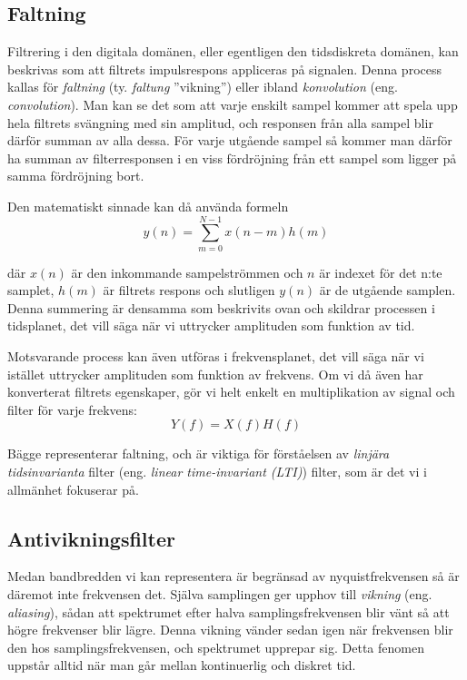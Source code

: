 \subsection{Faltning}

Filtrering i den digitala domänen, eller egentligen den tidsdiskreta domänen,
kan beskrivas som att filtrets impulsrespons appliceras på signalen. Denna
process kallas för \emph{faltning} (ty. \emph{faltung} ''vikning'') eller ibland
\emph{konvolution} (eng. \emph{convolution}).
Man kan se det som att varje enskilt sampel kommer att spela upp hela filtrets
svängning med sin amplitud, och responsen från alla sampel blir därför summan
av alla dessa.
För varje utgående sampel så kommer man därför ha summan av filterresponsen
i en viss fördröjning från ett sampel som ligger på samma fördröjning bort.

Den matematiskt sinnade kan då använda formeln
\[   y(n) = \sum_{m=0}^{N-1} x(n-m)h(m)   \]

där \(x(n)\) är den inkommande sampelströmmen och \(n\) är indexet för det
n:te samplet, \(h(m)\) är filtrets respons och slutligen \(y(n)\) är de utgående
samplen.
Denna summering är densamma som beskrivits ovan och skildrar processen
i tidsplanet, det vill säga när vi uttrycker amplituden som funktion av tid.

Motsvarande process kan även utföras i frekvensplanet, det vill säga när vi 
istället uttrycker amplituden som funktion av frekvens.
Om vi då även har konverterat filtrets egenskaper, gör vi helt enkelt en
multiplikation av signal och filter för varje frekvens:
\[   	Y(f) = X(f)H(f)   \]

Bägge representerar faltning, och är viktiga för förståelsen av \emph{linjära
tidsinvarianta} filter (eng. \emph{linear time-invariant (LTI)}) filter,
som är det vi i allmänhet fokuserar på.

\subsection{Antivikningsfilter}

Medan bandbredden vi kan representera är begränsad av nyquistfrekvensen så
är däremot inte frekvensen det.
Själva samplingen ger upphov till \emph{vikning} (eng. \emph{aliasing}),
sådan att spektrumet efter halva samplingsfrekvensen blir vänt så att högre
frekvenser blir lägre.
Denna vikning vänder sedan igen när frekvensen blir den hos
samplingsfrekvensen, och spektrumet upprepar sig.
Detta fenomen uppstår alltid när man går mellan kontinuerlig och diskret tid.

